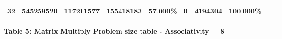 \documentclass[11pt]{article}
\begin{document}
\begin{longtable}[]{@{}llllllllll@{}}
\begin{minipage}[t]{0.09\columnwidth}
32\strut
\end{minipage} & \begin{minipage}[t]{0.07\columnwidth}\raggedright\strut
545259520\strut
\end{minipage} & \begin{minipage}[t]{0.06\columnwidth}\raggedright\strut
117211577\strut
\end{minipage} & \begin{minipage}[t]{0.07\columnwidth}\raggedright\strut
155418183\strut
\end{minipage} & \begin{minipage}[t]{0.07\columnwidth}\raggedright\strut
57.000\%\strut
\end{minipage} & \begin{minipage}[t]{0.06\columnwidth}\raggedright\strut
0\strut
\end{minipage} & \begin{minipage}[t]{0.07\columnwidth}\raggedright\strut
4194304\strut
\end{minipage} & \begin{minipage}[t]{0.07\columnwidth}\raggedright\strut
100.000\%\strut
\end{minipage}\tabularnewline
\bottomrule
\end{longtable}

\paragraph{Table 5: Matrix Multiply Problem size table - Associativity =
8}\label{table-5-matrix-multiply-problem-size-table---associativity-8}
\end{document}
